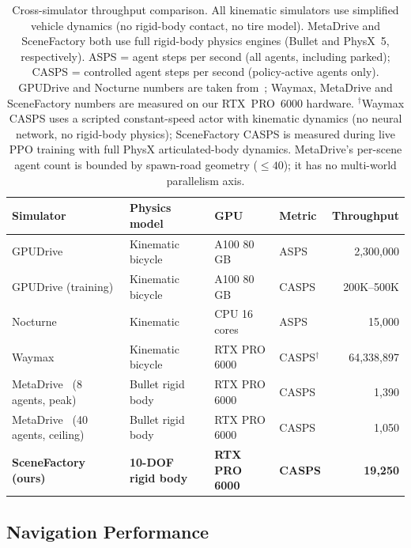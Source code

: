 \begin{table}[t]
\centering
\caption{Cross-simulator throughput comparison.
All kinematic simulators use simplified vehicle dynamics (no rigid-body contact, no tire model).
MetaDrive and SceneFactory both use full rigid-body physics engines (Bullet and PhysX~5, respectively).
ASPS = agent steps per second (all agents, including parked); CASPS = controlled agent steps per second (policy-active agents only).
GPUDrive and Nocturne numbers are taken from~\cite{kazemkhani_gpudrive_2025}; Waymax, MetaDrive and SceneFactory numbers are measured on our RTX~PRO~6000 hardware.
$^\dagger$Waymax CASPS uses a scripted constant-speed actor with kinematic dynamics (no neural network, no rigid-body physics); SceneFactory CASPS is measured during live PPO training with full PhysX articulated-body dynamics.
MetaDrive's per-scene agent count is bounded by spawn-road geometry ($\leq 40$); it has no multi-world parallelism axis.}
\label{tab:cross_simulator}
\small
\begin{tabular}{llllr}
\toprule
Simulator & Physics model & GPU & Metric & Throughput \\
\midrule
GPUDrive~\cite{kazemkhani_gpudrive_2025}
  & Kinematic bicycle & A100 80\,GB & ASPS & 2{,}300{,}000 \\
GPUDrive (training)
  & Kinematic bicycle & A100 80\,GB & CASPS & 200K--500K \\
Nocturne~\cite{vinitsky_nocturne_2022}
  & Kinematic & CPU 16 cores & ASPS & 15{,}000 \\
Waymax~\cite{gulino_waymax_2023}
  & Kinematic bicycle & RTX PRO 6000 & CASPS$^\dagger$ & 64{,}338{,}897 \\
\midrule
MetaDrive~\cite{li2022metadrive} (8 agents, peak)
  & Bullet rigid body & RTX PRO 6000 & CASPS & 1{,}390 \\
MetaDrive~\cite{li2022metadrive} (40 agents, ceiling)
  & Bullet rigid body & RTX PRO 6000 & CASPS & 1{,}050 \\
\midrule
\textbf{SceneFactory (ours)}
  & \textbf{10-DOF rigid body} & \textbf{RTX PRO 6000} & \textbf{CASPS} & \textbf{19{,}250} \\
\bottomrule
\end{tabular}
\end{table}

\subsection{Navigation Performance}
\label{sec:navigation_perf}

